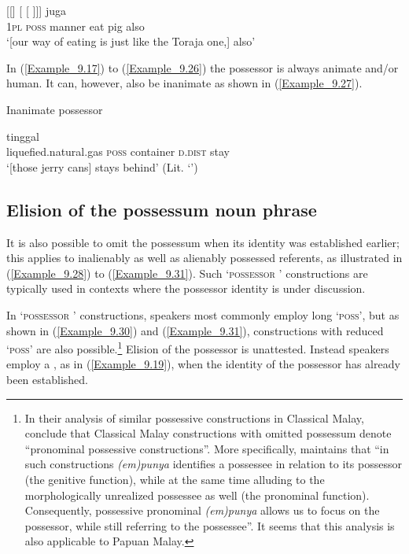 \ea
\label{Example_9.26}
\gll {\ldots} {[[]} {} {[} {[} {]]]} {juga}\\ %
 { }  \textsc{1pl}  \textsc{poss}  manner  eat  pig  also\\
\glt 
‘[our way of eating is just like the Toraja one,]  also’ \textstyleExampleSource{[081014-017-CvPr.0053]}
\z



In (\ref{Example_9.17}) to (\ref{Example_9.26}) the possessor is always animate and/or human. It can, however, also be inanimate as shown in (\ref{Example_9.27}).


\begin{styleExampleTitle}
Inanimate possessor
\end{styleExampleTitle}

\ea
\label{Example_9.27}
\gll {\ldots} {} {} {} {} {tinggal}\\ %
 { }  liquefied.natural.gas  \textsc{poss}  container  \textsc{d.dist}  stay\\
 ‘[those jerry cans]  stays behind’ (Lit. ‘’) \textstyleExampleSource{[081110-002-Cv.0075]}
\z


\subsection[Elision of the possessum noun phrase]{Elision of the possessum noun phrase}
\label{Para_9.2.1.2}
It is also possible to omit the possessum when its identity was established earlier; this applies to inalienably as well as alienably possessed referents, as illustrated in (\ref{Example_9.28}) to (\ref{Example_9.31}). Such ‘\textsc{possessor} ’ constructions are typically used in contexts where the possessor identity is under discussion.



In `\textsc{possessor} ’ constructions, speakers most commonly employ long  ‘\textsc{poss}’, but as shown in (\ref{Example_9.30}) and (\ref{Example_9.31}), constructions with reduced  ‘\textsc{poss}’ are also possible.\footnote{In their analysis of similar possessive constructions in Classical Malay, \citet[157]{Yap.2004} conclude that Classical Malay  constructions with omitted possessum denote “pronominal possessive constructions”. More specifically, \citet[7]{Yap.2007} maintains that “in such constructions \textit{(em)punya }identifies a possessee in relation to its possessor (the genitive function), while at the same time alluding to the morphologically unrealized possessee as well (the pronominal function). Consequently, possessive pronominal \textit{(em)punya }allows us to focus on the possessor, while still referring to the possessee”. It seems that this analysis is also applicable to Papuan Malay.} Elision of the possessor is unattested. Instead speakers employ a , as in (\ref{Example_9.19}), when the identity of the possessor has already been established.


